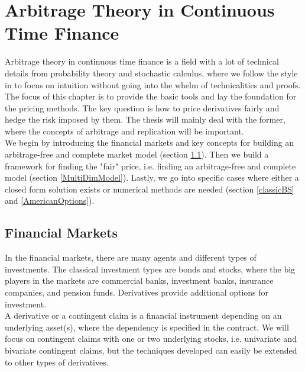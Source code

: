 
\chapter{Arbitrage Theory in Continuous Time Finance} %

\label{Chapter2} %

Arbitrage theory in continuous time finance is a field with a lot of technical details from probability theory and stochastic calculus, where we follow the style in \parencite{Hull, finKont} to focus on intuition without going into the whelm of technicalities and proofs. The focus of this chapter is to provide the basic tools and lay the foundation for the pricing methods. The key question is how to price derivatives fairly and hedge the risk imposed by them. The thesis will mainly deal with the former, where the concepts of arbitrage and replication will be important.\\

We begin by introducing the financial markets and key concepts for building an arbitrage-free and complete market model (section \ref{FinMarket}). Then we build a framework for finding the "fair" price, i.e. finding an arbitrage-free and complete model (section \ref{MultiDimModel}). Lastly, we go into specific cases where either a closed form solution exists or numerical methods are needed (section \ref{classicBS} and \ref{AmericanOptions}).


\section{Financial Markets}\label{FinMarket}
In the financial markets, there are many agents and different types of investments. The classical investment types are bonds and stocks, where the big players in the markets are commercial banks, investment banks, insurance companies, and pension funds. Derivatives provide additional options for investment.\\

A derivative or a contingent claim is a financial instrument depending on an underlying asset(s), where the dependency is specified in the contract. We will focus on contingent claims with one or two underlying stocks, i.e. univariate and bivariate contingent claims, but the techniques developed can easily be extended to other types of derivatives. \\

